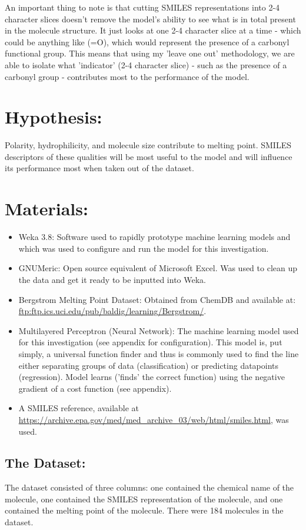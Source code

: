 \documentclass[11pt]{article}
\begin{document}
An important thing to note is that cutting SMILES representations into 2-4 character slices doesn't remove the model's
ability to see what is in total present in the molecule structure. It just looks at one 2-4 character slice at a time - 
which could be anything like (=O), which would represent the presence of a carbonyl functional group. This means that using my
'leave one out' methodology, we are able to isolate what 'indicator' (2-4 character slice) - such as the presence of a carbonyl group - contributes
most to the performance of the model. 
\section{Hypothesis:}
\label{sec:orgc9eb0f7}
Polarity, hydrophilicity, and molecule size contribute to melting point. SMILES descriptors of these qualities will be most
useful to the model and will influence its performance most when taken out of the dataset. 
\section{Materials:}
\label{sec:org885a8a4}
\begin{itemize}
\item Weka 3.8: Software used to rapidly prototype machine learning models and which was used to configure and run the model for this investigation.
\item GNUMeric: Open source equivalent of Microsoft Excel. Was used to clean up the data and get it ready to be inputted into Weka.
\item Bergstrom Melting Point Dataset: Obtained from ChemDB and available at: \url{ftp:ftp.ics.uci.edu/pub/baldig/learning/Bergstrom/}.
\item Multilayered Perceptron (Neural Network): The machine learning model used for this investigation (see appendix for configuration). This model is, put simply, a universal function finder and thus is commonly used to find the line either separating groups of data (classification) or predicting datapoints (regression). Model learns ('finds' the correct function) using the negative gradient of a cost function (see appendix).
\item A SMILES reference, available at \url{https://archive.epa.gov/med/med\_archive\_03/web/html/smiles.html}, was used.
\end{itemize}
\subsection{The Dataset:}
\label{sec:org3bca371}
The dataset consisted of three columns: one contained the chemical name of the molecule, one contained the SMILES representation of the molecule, and one contained the melting point of the molecule.
There were 184 molecules in the dataset.
\end{document}
